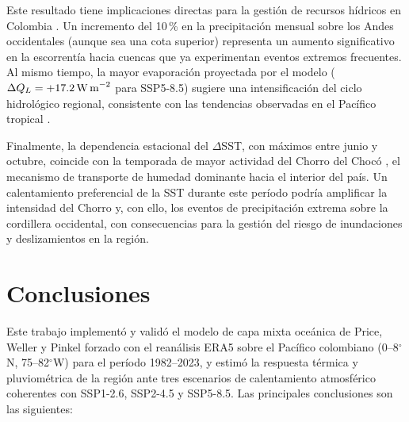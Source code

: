 \documentclass[12pt, a4paper]{article}
\begin{document}
Este resultado tiene implicaciones directas para la gesti\'on de recursos h\'idricos 
en Colombia \cite{MoralesMarın2026}. Un incremento del 10\,\% en la precipitaci\'on 
mensual sobre los Andes occidentales (aunque sea una cota superior) representa 
un aumento significativo en la escorrent\'ia hacia cuencas que ya experimentan eventos 
extremos frecuentes. Al mismo tiempo, la mayor evaporaci\'on proyectada por el modelo 
($\Delta Q_L = +17.2\,\text{W\,m}^{-2}$ para SSP5-8.5) sugiere una intensificaci\'on 
del ciclo hidrol\'ogico regional, consistente con las tendencias observadas en el 
Pac\'ifico tropical \cite{Poveda2011}.

Finalmente, la dependencia estacional del $\Delta$SST, con m\'aximos entre junio 
y octubre, coincide con la temporada de mayor actividad del Chorro del Choc\'o 
\cite{Poveda2004}, el mecanismo de transporte de humedad dominante hacia el interior 
del pa\'is. Un calentamiento preferencial de la SST durante este per\'iodo podr\'ia 
amplificar la intensidad del Chorro y, con ello, los eventos de precipitaci\'on extrema 
sobre la cordillera occidental, con consecuencias para la gesti\'on del riesgo de 
inundaciones y deslizamientos en la regi\'on.

\section{Conclusiones}

Este trabajo implement\'o y valid\'o el modelo de capa mixta oce\'anica de Price, 
Weller y Pinkel forzado con el rean\'alisis ERA5 sobre el Pac\'ifico colombiano 
(0--8$^{\circ}$N, 75--82$^{\circ}$W) para el per\'iodo 1982--2023, y estim\'o la 
respuesta t\'ermica y pluviom\'etrica de la regi\'on ante tres escenarios de 
calentamiento atmosf\'erico coherentes con SSP1-2.6, SSP2-4.5 y SSP5-8.5. Las 
principales conclusiones son las siguientes:
\end{document}
